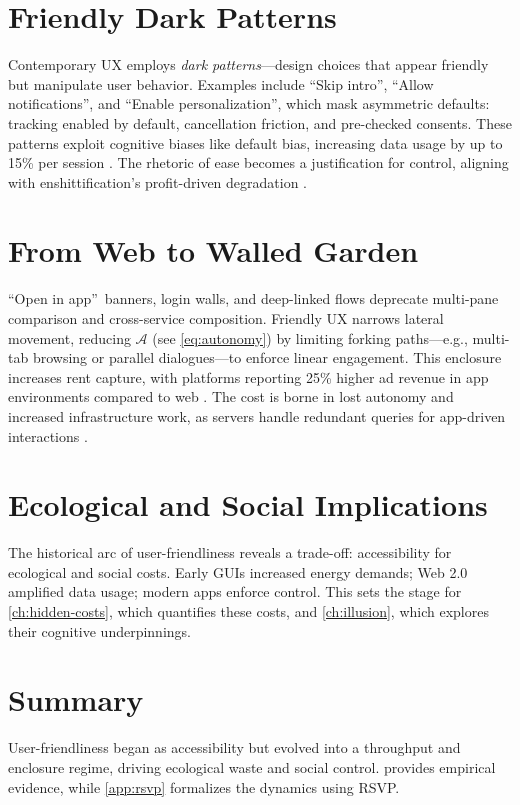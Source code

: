 \documentclass[openany]{book}
\newcommand{\Auton}{\mathcal{A}} %
\begin{document}
\section{Friendly Dark Patterns}
\label{sec:history-dark}
Contemporary UX employs \emph{dark patterns}---design choices that appear friendly but manipulate user behavior. Examples include \textquotedblleft Skip intro\textquotedblright, \textquotedblleft Allow notifications\textquotedblright, and \textquotedblleft Enable personalization\textquotedblright, which mask asymmetric defaults: tracking enabled by default, cancellation friction, and pre-checked consents. These patterns exploit cognitive biases like default bias, increasing data usage by up to 15\% per session \citep{colak2024}. The rhetoric of ease becomes a justification for control, aligning with enshittification’s profit-driven degradation \citep{doctorow2022}.

\section{From Web to Walled Garden}
\label{sec:history-walled}
\textquotedblleft Open in app\textquotedblright\ banners, login walls, and deep-linked flows deprecate multi-pane comparison and cross-service composition. Friendly UX narrows lateral movement, reducing $\Auton$ (see \cref{eq:autonomy}) by limiting forking paths---e.g., multi-tab browsing or parallel dialogues---to enforce linear engagement. This enclosure increases rent capture, with platforms reporting 25\% higher ad revenue in app environments compared to web \citep{doctorow2022}. The cost is borne in lost autonomy and increased infrastructure work, as servers handle redundant queries for app-driven interactions \citep{extentia2024}.

\section{Ecological and Social Implications}
\label{sec:history-implications}
The historical arc of user-friendliness reveals a trade-off: accessibility for ecological and social costs. Early GUIs increased energy demands; Web 2.0 amplified data usage; modern apps enforce control. This sets the stage for \cref{ch:hidden-costs}, which quantifies these costs, and \cref{ch:illusion}, which explores their cognitive underpinnings.

\section{Summary}
User-friendliness began as accessibility but evolved into a throughput and enclosure regime, driving ecological waste and social control.  provides empirical evidence, while \cref{app:rsvp} formalizes the dynamics using RSVP.
\end{document}
